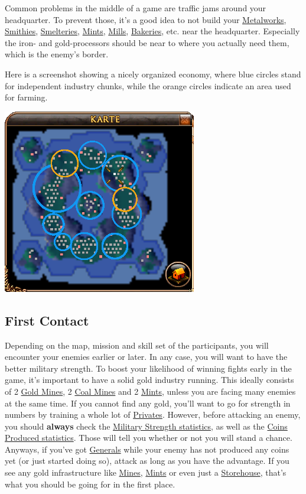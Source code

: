 \documentclass[12pt]{article}
\begin{document}
Common problems in the middle of a game are traffic jams around your headquarter. To prevent those, it's a good idea to not build your \hyperref[sec:metalworks]{Metalworks}, \hyperref[sec:smithy]{Smithies}, \hyperref[sec:smeltery]{Smelteries}, \hyperref[sec:mint]{Mints}, \hyperref[sec:mill]{Mills}, \hyperref[sec:bakery]{Bakeries}, etc. near the headquarter. Especially the iron- and gold-processors should be near to where you actually need them, which is the enemy's border.

\vspace{12pt}
Here is a screenshot showing a nicely organized economy, where blue circles stand for independent industry chunks, while the orange circles indicate an area used for farming.

\vspace{1cm}
\includegraphics{decentralization_map_edited}
\vspace{1cm}

\subsection{First Contact}
\label{sec:firstcontact}

Depending on the map, mission and skill set of the participants, you will encounter your enemies earlier or later. In any case, you will want to have the better military strength. To boost your likelihood of winning fights  early in the game, it's important to have a solid gold industry running. This ideally consists of 2 \hyperref[sec:goldmine]{Gold Mines}, 2 \hyperref[sec:coalmine]{Coal Mines} and 2 \hyperref[sec:mint]{Mints}, unless you are facing many enemies at the same time. If you cannot find any gold, you'll want to go for strength in numbers by training a whole lot of \hyperref[sec:private]{Privates}. However, before attacking an enemy, you should \textbf{always} check the \hyperref[sec:statisticsmilitary]{Military Strength statistics}, as well as the \hyperref[sec:statisticscoins]{Coins Produced statistics}. Those will tell you whether or not you will stand a chance. Anyways, if you've got \hyperref[sec:general]{Generals} while your enemy has not produced any coins yet (or just started doing so), attack as long as you have the advantage. If you see any gold infrastructure like \hyperref[sec:goldmine]{Mines}, \hyperref[sec:mint]{Mints} or even just a \hyperref[sec:storehouse]{Storehouse}, that's what you should be going for in the first place.
\end{document}
